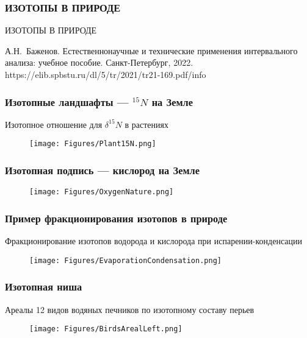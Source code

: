 \begin{frame}
\frametitle{ИЗОТОПЫ В ПРИРОДЕ}

\begin{center}
{\large
ИЗОТОПЫ В ПРИРОДЕ}
\end{center}


 А.Н.~Баженов.	Естественнонаучные и технические применения интервального анализа: учебное пособие. Санкт-Петербург, 2022.\\
 https://elib.spbstu.ru/dl/5/tr/2021/tr21-169.pdf/info
\end{frame}


\begin{frame}
	\frametitle{Изотопные ландшафты --- $^{15}N$ на Земле}
	
Изотопное отношение для $\delta^{15}N$ в растениях	

\begin{figure}[ht] 
			\centering\small
			\unitlength=1mm
			{\texttt{[image: Figures/Plant15N.png]}} 
\end{figure}
	
	
\end{frame}

\begin{frame}
	\frametitle{ Изотопная подпись  --- кислород  на Земле}
		\begin{figure}[ht] 
			\centering\small
			\unitlength=1mm
			\texttt{[image: Figures/OxygenNature.png]} 
		\end{figure}

\end{frame}


\begin{frame}
\frametitle{Пример фракционирования изотопов в природе}

Фракционирование изотопов водорода и кислорода при испарении-конденсации
\begin{figure}[ht] 
	\centering\small
	\unitlength=1mm
	\texttt{[image: Figures/EvaporationCondensation.png]} 
\end{figure}

\end{frame}


\begin{frame}
	\frametitle{Изотопная ниша }
Ареалы 12 видов водяных печников по изотопному составу перьев 
		\begin{figure}[ht] 
			\centering\small
			\unitlength=1mm
			\texttt{[image: Figures/BirdsArealLeft.png]}
	\end{figure}



\end{frame}
